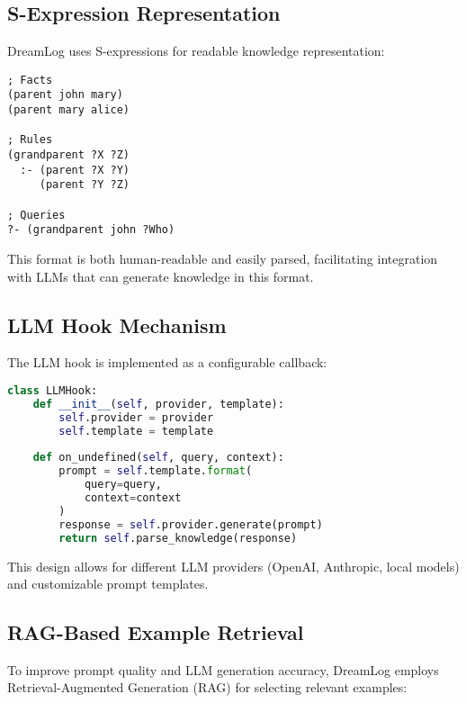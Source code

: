 \documentclass[10pt,conference]{IEEEtran}
\begin{document}
\subsection{S-Expression Representation}

DreamLog uses S-expressions for readable knowledge representation:

\begin{lstlisting}
; Facts
(parent john mary)
(parent mary alice)

; Rules  
(grandparent ?X ?Z)
  :- (parent ?X ?Y)
     (parent ?Y ?Z)

; Queries
?- (grandparent john ?Who)
\end{lstlisting}

This format is both human-readable and easily parsed, facilitating integration with LLMs that can generate knowledge in this format.

\subsection{LLM Hook Mechanism}

The LLM hook is implemented as a configurable callback:

\begin{lstlisting}[language=Python]
class LLMHook:
    def __init__(self, provider, template):
        self.provider = provider
        self.template = template
    
    def on_undefined(self, query, context):
        prompt = self.template.format(
            query=query,
            context=context
        )
        response = self.provider.generate(prompt)
        return self.parse_knowledge(response)
\end{lstlisting}

This design allows for different LLM providers (OpenAI, Anthropic, local models) and customizable prompt templates.

\subsection{RAG-Based Example Retrieval}

To improve prompt quality and LLM generation accuracy, DreamLog employs Retrieval-Augmented Generation (RAG) for selecting relevant examples:
\end{document}
